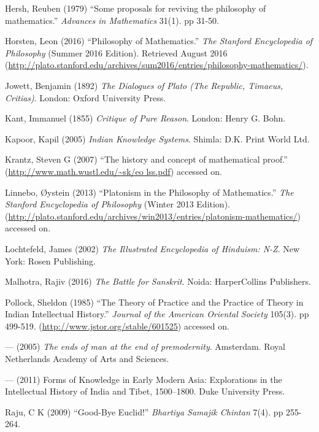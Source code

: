 \begin{thebibliography}{99}
Hersh, Reuben (1979) ``Some proposals for reviving the philosophy of mathematics.'' {\sl Advances in Mathematics} 31(1). pp 31-50.

Horsten, Leon (2016) ``Philosophy of Mathematics.'' {\sl The Stanford Encyclopedia of Philosophy} (Summer 2016 Edition). Retrieved August 2016 (\url{http://plato.stanford.edu/archives/sum2016/entries/philosophy-mathematics/}).

Jowett, Benjamin (1892) {\sl The Dialogues of Plato (The Republic, Timaeus, Critias)}. London: Oxford University Press.

Kant, Immanuel (1855) {\sl Critique of Pure Reason}. London: Henry G. Bohn. 

Kapoor, Kapil (2005) {\sl Indian Knowledge Systems}. Shimla: D.K. Print World Ltd.

Krantz, Steven G (2007) ``The history and concept of mathematical proof.'' (\url{http://www.math.wustl.edu/~sk/eo lss.pdf}) accessed on.

Linnebo, Øystein (2013) ``Platonism in the Philosophy of Mathematics.'' {\sl The Stanford Encyclopedia of Philosophy} (Winter 2013 Edition). (\url{http://plato.stanford.edu/archives/win2013/entries/platonism-mathematics/}) accessed on.

Lochtefeld, James (2002) {\sl The Illustrated Encyclopedia of Hinduism: N-Z}. New York: Rosen Publishing.

Malhotra, Rajiv (2016) {\sl The Battle for Sanskrit}. Noida: HarperCollins Publishers.

Pollock, Sheldon (1985) ``The Theory of Practice and the Practice of Theory in Indian Intellectual History.'' {\sl Journal of the American Oriental Society} 105(3). pp 499-519. (\url{http://www.jstor.org/stable/601525}) accessed on.

--- (2005) {\sl The ends of man at the end of premodernity}. Amsterdam. Royal Netherlands Academy of Arts and Sciences.

--- (2011) Forms of Knowledge in Early Modern Asia: Explorations in the Intellectual History of India and Tibet, 1500--1800. Duke University Press.

Raju, C K (2009) ``Good-Bye Euclid!'' {\sl Bhartiya Samajik Chintan} 7(4). pp 255-264.


\end{thebibliography}

